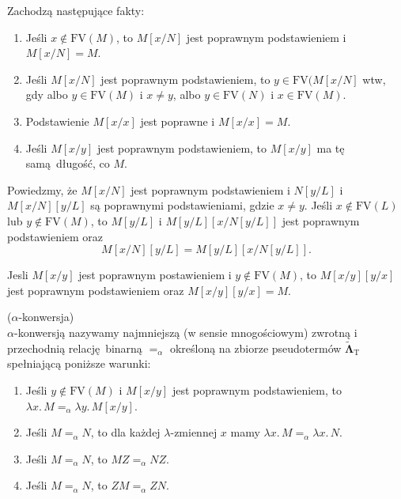 \noindent Zachodzą następujące fakty:
    \begin{fakt}
      \begin{enumerate}[label=({\alph*})]
        \item Jeśli \(x\not\in\mathrm{FV}(M)\), to \(M[x/N]\) jest poprawnym podstawieniem i \(M[x/N]=M\).
        \item Jeśli \(M[x/N]\) jest poprawnym podstawieniem, to \(y\in\mathrm{FV}(M[x/N]\) wtw, gdy albo \(y\in\mathrm{FV}(M)\)
          i \(x\neq y\), albo \(y\in \mathrm{FV}(N)\) i \(x\in \mathrm{FV}(M)\).
        \item Podstawienie \(M[x/x]\) jest poprawne i \(M[x/x]=M\).
        \item Jeśli \(M[x/y]\) jest poprawnym podstawieniem, to \(M[x/y]\) ma tę samą długość, co \(M\).
      \end{enumerate}
    \end{fakt}
    \begin{fakt}
      Powiedzmy, że \(M[x/N]\) jest poprawnym podstawieniem i \(N[y/L]\) i \(M[x/N][y/L]\) są poprawnymi podstawieniami, gdzie
      \(x\neq y\). Jeśli \(x\not\in \mathrm{FV}(L)\) lub \(y\not\in\mathrm{FV}(M)\), to \(M[y/L]\) i \( M[y/L]\left[x/N[y/L]\right] \) jest poprawnym podstawieniem oraz
      \[
        M[x/N][y/L]=M[y/L][x/N[y/L]].
      \]
    \end{fakt}

    \begin{fakt}
      Jesli \(M[x/y]\) jest poprawnym postawieniem i \(y\not\in\mathrm{FV}(M)\), to \(M[x/y][y/x]\) jest poprawnym podstawieniem oraz
      \(M[x/y][y/x]=M\).
    \end{fakt}

  \begin{definicja}(\(\alpha\)-konwersja)\\
    \(\alpha\)-konwersją nazywamy najmniejszą (w sensie mnogościowym) zwrotną i przechodnią relację binarną \(=_\alpha\) określoną na zbiorze pseudotermów \(\mathbf{\tilde{\Lambda}}_{\mathrm{T}}\) spełniającą poniższe warunki:
    \begin{enumerate}[label=({\alph*})]
      \item Jeśli \(y\not\in \mathrm{FV}(M)\) i \(M[x/y]\) jest poprawnym podstawieniem, to \(\lambda x.\, M  =_\alpha \lambda y.\, M[x/y]\).
      \item Jeśli \(M=_\alpha N\), to dla każdej \(\lambda\)-zmiennej \(x\) mamy \(\lambda x.\, M =_\alpha \lambda x.\,N\).
      \item Jeśli \(M=_\alpha N\), to \(M Z=_\alpha N Z\).
      \item Jeśli \(M=_\alpha N\), to \(ZM =_\alpha ZN\).
    \end{enumerate}
  \end{definicja}

